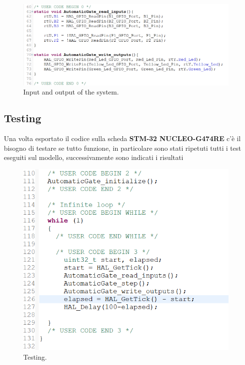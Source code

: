 \documentclass[12pt]{article}
\begin{document}
\begin{figure}[H]
    \centering
    \includegraphics[width=1\textwidth]{snippet/input_output.png}
    \caption{Input and output of the system.}
\end{figure}
\newpage
\subsection{Testing}
Una volta esportato il codice sulla scheda \textbf{STM-32 NUCLEO-G474RE} c'è il bisogno di testare se tutto funzione, in particolare sono stati ripetuti tutti i test eseguiti sul modello, successivamente sono indicati i risultati
\begin{figure}[H]
    \centering
    \includegraphics[width=1\textwidth]{snippet/main.png}
    \caption{Testing.}
\end{figure}
\newpage
{}
\listoffigures
\end{document}
